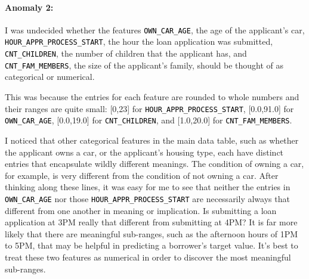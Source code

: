 \documentclass[12pt, letterpaper]{article}
\begin{document}
\paragraph{Anomaly 2:}
I was undecided whether the features \colorbox{backcolor}{\textcolor{black}{\texttt{OWN_CAR_AGE}}}, the age of the applicant's car,  \colorbox{backcolor}{\textcolor{black}{\texttt{HOUR_APPR_PROCESS_START}}}, the hour the loan application was submitted, \colorbox{backcolor}{\textcolor{black}{\texttt{CNT_CHILDREN}}}, the number of children that the applicant has, and \colorbox{backcolor}{\textcolor{black}{\texttt{CNT_FAM_MEMBERS}}}, the size of the applicant's family, should be thought of as categorical or numerical.

This was because the entries for each feature are rounded to whole numbers and their ranges are quite small: [0,23] for \colorbox{backcolor}{\textcolor{black}{\texttt{HOUR_APPR_PROCESS_START}}}, [0.0,91.0] for \colorbox{backcolor}{\textcolor{black}{\texttt{OWN_CAR_AGE}}}, [0.0,19.0] for \colorbox{backcolor}{\textcolor{black}{\texttt{CNT_CHILDREN}}}, and [1.0,20.0] for \colorbox{backcolor}{\textcolor{black}{\texttt{CNT_FAM_MEMBERS}}}.

I noticed that other categorical features in the main data table, such as whether the applicant owns a car, or the applicant's housing type, each have distinct entries that encapsulate wildly different meanings. The condition of owning a car, for example, is very different from the condition of not owning a car. After thinking along these lines, it was easy for me to see that neither the entries in \colorbox{backcolor}{\textcolor{black}{\texttt{OWN_CAR_AGE}}} nor those \colorbox{backcolor}{\textcolor{black}{\texttt{HOUR_APPR_PROCESS_START}}} are necessarily always that different from one another in meaning or implication. Is submitting a loan application at 3PM really that different from submitting at 4PM? It is far more likely that there are meaningful sub-ranges, such as the afternoon hours of 1PM to 5PM, that may be helpful in predicting a borrower's target value. It's best to treat these two features as numerical in order to discover the most meaningful sub-ranges.
\end{document}
